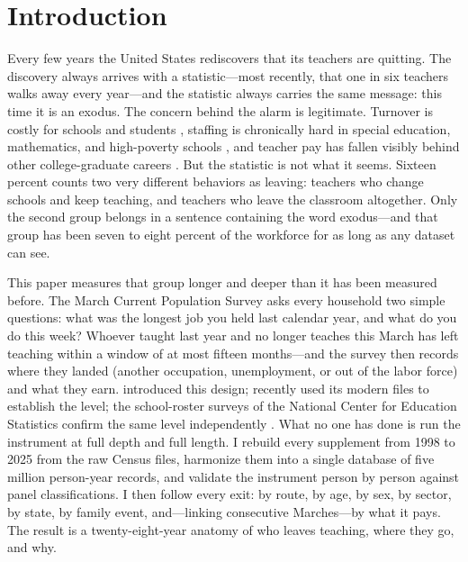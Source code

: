 \documentclass[11pt,a4paper]{article}
\begin{document}
\clearpage

\section{Introduction}\label{sec:intro}

Every few years the United States rediscovers that its teachers are
quitting. The discovery always arrives with a statistic---most
recently, that one in six teachers walks away every year---and the
statistic always carries the same message: this time it is an exodus.
The concern behind the alarm is legitimate. Turnover is costly for
schools and students \citep{ronfeldt2013,hanushek2004}, staffing is
chronically hard in special education, mathematics, and high-poverty
schools \citep{carverthomas2017}, and teacher pay has fallen visibly
behind other college-graduate careers \citep{allegretto2023}. But the
statistic is not what it seems. Sixteen percent counts two very
different behaviors as leaving: teachers who change schools and keep
teaching, and teachers who leave the classroom altogether. Only the
second group belongs in a sentence containing the word exodus---and
that group has been seven to eight percent of the workforce for as
long as any dataset can see.

This paper measures that group longer and deeper than it has been
measured before. The March Current Population Survey asks every
household two simple questions: what was the longest job you held last
calendar year, and what do you do this week? Whoever taught last year
and no longer teaches this March has left teaching within a window of
at most fifteen months---and the survey then records where they landed
(another occupation, unemployment, or out of the labor force) and what
they earn. \citet{harris2007} introduced this design; \citet{aldeman2025}
recently used its modern files to establish the level; the school-roster
surveys of the National Center for Education Statistics confirm the same
level independently \citep{nces2024}. What no one has done is run the
instrument at full depth and full length. I rebuild every supplement
from 1998 to 2025 from the raw Census files, harmonize them into a
single database of five million person-year records, and validate the
instrument person by person against panel classifications. I then
follow every exit: by route, by age, by sex, by sector, by state, by
family event, and---linking consecutive Marches---by what it pays. The
result is a twenty-eight-year anatomy of who leaves teaching, where
they go, and why.
\end{document}
